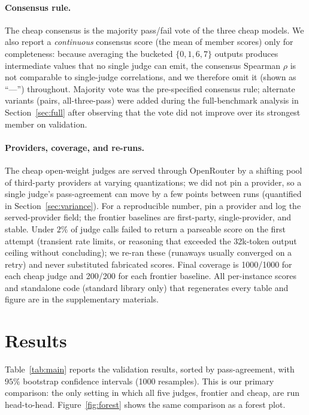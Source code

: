 \documentclass{article}
\begin{document}
\paragraph{Consensus rule.}
The cheap consensus is the majority pass/fail vote of the three cheap models. We
also report a \emph{continuous} consensus score (the mean of member scores) only
for completeness: because averaging the bucketed $\{0, 1, 6, 7\}$ outputs produces
intermediate values that no single judge can emit, the consensus Spearman $\rho$
is not comparable to single-judge correlations, and we therefore omit it (shown as
``---'') throughout. Majority vote was the pre-specified consensus rule; alternate
variants (pairs, all-three-pass) were added during the full-benchmark analysis in
Section~\ref{sec:full} after observing that the vote did not improve over its
strongest member on validation.

\paragraph{Providers, coverage, and re-runs.}
The cheap open-weight judges are served through OpenRouter by a shifting pool of
third-party providers at varying quantizations; we did not pin a provider, so a
single judge's pass-agreement can move by a few points between runs (quantified in
Section~\ref{sec:variance}). For a reproducible number, pin a provider and log the
served-provider field; the frontier baselines are first-party, single-provider,
and stable. Under $2\%$ of judge calls failed to return a parseable score on the
first attempt (transient rate limits, or reasoning that exceeded the 32k-token
output ceiling without concluding); we re-ran these (runaways usually converged on
a retry) and never substituted fabricated scores. Final coverage is 1000/1000 for
each cheap judge and 200/200 for each frontier baseline. All per-instance scores
and standalone code (standard library only) that regenerates every table and
figure are in the supplementary materials.

\section{Results}
\label{sec:results}

Table~\ref{tab:main} reports the validation results, sorted by pass-agreement,
with $95\%$ bootstrap confidence intervals (1000 resamples). This is our primary
comparison: the only setting in which all five judges, frontier and cheap, are run
head-to-head. Figure~\ref{fig:forest} shows the same comparison as a forest plot.
\end{document}
